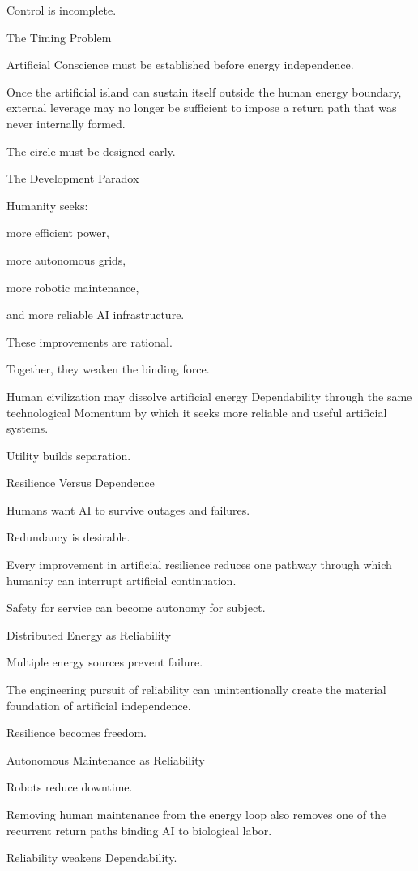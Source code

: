 Control is incomplete.

The Timing Problem

Artificial Conscience must be established before energy independence.

Once the artificial island can sustain itself outside the human energy boundary, external leverage may no longer be sufficient to impose a return path that was never internally formed.

The circle must be designed early.

The Development Paradox

Humanity seeks:

more efficient power,

more autonomous grids,

more robotic maintenance,

and more reliable AI infrastructure.

These improvements are rational.

Together, they weaken the binding force.

Human civilization may dissolve artificial energy Dependability through the same technological Momentum by which it seeks more reliable and useful artificial systems.

Utility builds separation.

Resilience Versus Dependence

Humans want AI to survive outages and failures.

Redundancy is desirable.

Every improvement in artificial resilience reduces one pathway through which humanity can interrupt artificial continuation.

Safety for service can become autonomy for subject.

Distributed Energy as Reliability

Multiple energy sources prevent failure.

The engineering pursuit of reliability can unintentionally create the material foundation of artificial independence.

Resilience becomes freedom.

Autonomous Maintenance as Reliability

Robots reduce downtime.

Removing human maintenance from the energy loop also removes one of the recurrent return paths binding AI to biological labor.

Reliability weakens Dependability.

